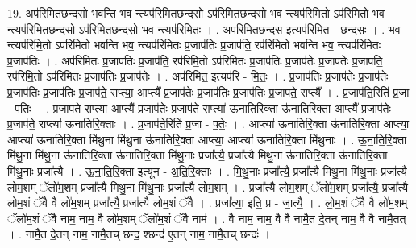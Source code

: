 \documentclass[17pt]{extarticle}
\begin{document}
19. अप॑रिमितछन्दसो भवन्ति भव॒ न्त्यप॑रिमितछन्द॒सो ऽप॑रिमितछन्दसो भव॒ न्त्यप॑रिमि॒तो ऽप॑रिमितो भव॒ न्त्यप॑रिमितछन्द॒सो ऽप॑रिमितछन्दसो भव॒ न्त्यप॑रिमितः । . अप॑रिमितछन्दस॒ इत्यप॑रिमित - छ॒न्द॒सः॒ । . भ॒व॒ न्त्यप॑रिमि॒तो ऽप॑रिमितो भवन्ति भव॒ न्त्यप॑रिमितः प्र॒जाप॑तिः प्र॒जाप॑ति॒ रप॑रिमितो भवन्ति भव॒ न्त्यप॑रिमितः प्र॒जाप॑तिः । . अप॑रिमितः प्र॒जाप॑तिः प्र॒जाप॑ति॒ रप॑रिमि॒तो ऽप॑रिमितः प्र॒जाप॑तिः प्र॒जाप॑तेः प्र॒जाप॑तेः प्र॒जाप॑ति॒ रप॑रिमि॒तो ऽप॑रिमितः प्र॒जाप॑तिः प्र॒जाप॑तेः । . अप॑रिमित॒ इत्यप॑रि - मि॒तः॒ । . प्र॒जाप॑तिः प्र॒जाप॑तेः प्र॒जाप॑तेः प्र॒जाप॑तिः प्र॒जाप॑तिः प्र॒जाप॑ते॒ राप्त्या॒ आप्त्यै᳚ प्र॒जाप॑तेः प्र॒जाप॑तिः प्र॒जाप॑तिः प्र॒जाप॑ते॒ राप्त्यै᳚ । . प्र॒जाप॑ति॒रिति॑ प्र॒जा - प॒तिः॒ । . प्र॒जाप॑ते॒ राप्त्या॒ आप्त्यै᳚ प्र॒जाप॑तेः प्र॒जाप॑ते॒ राप्त्या॑ ऊनातिरि॒क्ता ऊ॑नातिरि॒क्ता आप्त्यै᳚ प्र॒जाप॑तेः प्र॒जाप॑ते॒ राप्त्या॑ ऊनातिरि॒क्ताः । . प्र॒जाप॑ते॒रिति॑ प्र॒जा - प॒तेः॒ । . आप्त्या॑ ऊनातिरि॒क्ता ऊ॑नातिरि॒क्ता आप्त्या॒ आप्त्या॑ ऊनातिरि॒क्ता मि॑थु॒ना मि॑थु॒ना ऊ॑नातिरि॒क्ता आप्त्या॒ आप्त्या॑ ऊनातिरि॒क्ता मि॑थु॒नाः । . ऊ॒ना॒ति॒रि॒क्ता मि॑थु॒ना मि॑थु॒ना ऊ॑नातिरि॒क्ता ऊ॑नातिरि॒क्ता मि॑थु॒नाः प्रजा᳚त्यै॒ प्रजा᳚त्यै मिथु॒ना ऊ॑नातिरि॒क्ता ऊ॑नातिरि॒क्ता मि॑थु॒नाः प्रजा᳚त्यै । . ऊ॒ना॒ति॒रि॒क्ता इत्यू॑न - अ॒ति॒रि॒क्ताः । . मि॒थु॒नाः प्रजा᳚त्यै॒ प्रजा᳚त्यै मिथु॒ना मि॑थु॒नाः प्रजा᳚त्यै लोम॒शम् ॅलो॑म॒शम् प्रजा᳚त्यै मिथु॒ना मि॑थु॒नाः प्रजा᳚त्यै लोम॒शम् । . प्रजा᳚त्यै लोम॒शम् ॅलो॑म॒शम् प्रजा᳚त्यै॒ प्रजा᳚त्यै लोम॒शं ॅवै वै लो॑म॒शम् प्रजा᳚त्यै॒ प्रजा᳚त्यै लोम॒शं ॅवै । . प्रजा᳚त्या॒ इति॒ प्र - जा॒त्यै॒ । . लो॒म॒शं ॅवै वै लो॑म॒शम् ॅलो॑म॒शं ॅवै नाम॒ नाम॒ वै लो॑म॒शम् ॅलो॑म॒शं ॅवै नाम॑ । . वै नाम॒ नाम॒ वै वै नामै॒त दे॒तन् नाम॒ वै वै नामै॒तत् । . नामै॒त दे॒तन् नाम॒ नामै॒तच् छन्द॒ श्छन्द॑ ए॒तन् नाम॒ नामै॒तच् छन्दः॑ । \newline
\end{document}

